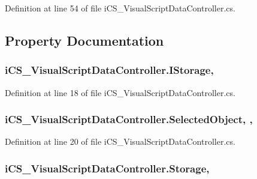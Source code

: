 Definition at line 54 of file i\+C\+S\+\_\+\+Visual\+Script\+Data\+Controller.\+cs.



\subsection{Property Documentation}
\hypertarget{classi_c_s___visual_script_data_controller_ab839d457a68f56a9baf57d490b17b0c2}{
\subsubsection[{I\+Storage}]{ i\+C\+S\+\_\+\+Visual\+Script\+Data\+Controller.\+I\+Storage\hspace{0.3cm}{\ttfamily [static]}, {\ttfamily [get]}}}\label{classi_c_s___visual_script_data_controller_ab839d457a68f56a9baf57d490b17b0c2}


Definition at line 18 of file i\+C\+S\+\_\+\+Visual\+Script\+Data\+Controller.\+cs.

\hypertarget{classi_c_s___visual_script_data_controller_a83431b4b536ec13e35db41850757373a}{
\subsubsection[{Selected\+Object}]{ i\+C\+S\+\_\+\+Visual\+Script\+Data\+Controller.\+Selected\+Object\hspace{0.3cm}{\ttfamily [static]}, {\ttfamily [get]}, {\ttfamily [set]}}}\label{classi_c_s___visual_script_data_controller_a83431b4b536ec13e35db41850757373a}


Definition at line 20 of file i\+C\+S\+\_\+\+Visual\+Script\+Data\+Controller.\+cs.

\hypertarget{classi_c_s___visual_script_data_controller_a0654dfaa53b1c19fe007c9f8897a119f}{
\subsubsection[{Storage}]{ i\+C\+S\+\_\+\+Visual\+Script\+Data\+Controller.\+Storage\hspace{0.3cm}{\ttfamily [static]}, {\ttfamily [get]}}}\label{classi_c_s___visual_script_data_controller_a0654dfaa53b1c19fe007c9f8897a119f}


